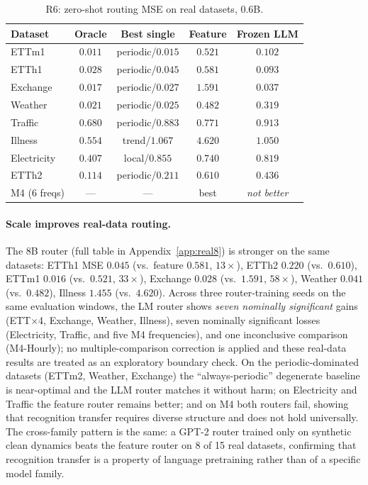 \documentclass{article}
\begin{document}
\begin{table}[t]
\centering
\small
\begin{tabular}{lcccc}
\toprule
Dataset & Oracle & Best single & Feature & Frozen LLM \\
\midrule
ETTm1 & $0.011$ & periodic/$0.015$ & $0.521$ & $\mathbf{0.102}$ \\
ETTh1 & $0.028$ & periodic/$0.045$ & $0.581$ & $\mathbf{0.093}$ \\
Exchange & $0.017$ & periodic/$0.027$ & $1.591$ & $\mathbf{0.037}$ \\
Weather & $0.021$ & periodic/$0.025$ & $0.482$ & $\mathbf{0.319}$ \\
Traffic & $0.680$ & periodic/$0.883$ & $0.771$ & $0.913$ \\
Illness & $0.554$ & trend/$1.067$ & $4.620$ & $\mathbf{1.050}$ \\
\midrule
Electricity & $0.407$ & local/$0.855$ & $\mathbf{0.740}$ & $0.819$ \\
ETTh2 & $0.114$ & periodic/$0.211$ & $\mathbf{0.610}$ & $0.436$ \\
M4 (6 freqs) & --- & --- & best & \emph{not better} \\
\bottomrule
\end{tabular}
\caption{R6: zero-shot routing MSE on real datasets, 0.6B.}
\label{tab:real}
\end{table}

\paragraph{Scale improves real-data routing.}
The $8$B router (full table in Appendix~\ref{app:real8}) is stronger on the
same datasets: ETTh1 MSE $0.045$ (vs.\ feature $0.581$, $13\times$), ETTh2
$0.220$ (vs.\ $0.610$), ETTm1 $0.016$ (vs.\ $0.521$, $33\times$), Exchange
$0.028$ (vs.\ $1.591$, $58\times$), Weather $0.041$ (vs.\ $0.482$), Illness
$1.455$ (vs.\ $4.620$).  Across three router-training seeds on the same
evaluation windows, the LM router shows \emph{seven nominally significant}
gains (ETT$\times$4, Exchange, Weather, Illness), seven nominally significant
losses (Electricity, Traffic, and five M4 frequencies), and one inconclusive
comparison (M4-Hourly); no multiple-comparison correction is applied and these
real-data results are treated as an exploratory boundary check.  On the
periodic-dominated datasets (ETTm2, Weather, Exchange) the ``always-periodic''
degenerate baseline is near-optimal and the LLM router matches it without
harm; on Electricity and Traffic the feature router remains better; and on M4
both routers fail, showing that recognition transfer requires diverse
structure and does not hold universally.  The cross-family pattern is the
same: a GPT-2 router trained only on synthetic clean dynamics beats the
feature router on 8 of 15 real datasets, confirming that recognition transfer
is a property of language pretraining rather than of a specific model family.
\end{document}
